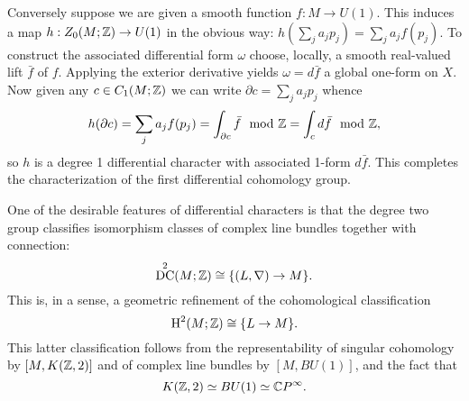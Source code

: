 \documentclass{amsart}
\DeclareMathOperator{\DC}{DC} %
\begin{document}
Conversely suppose we are given a smooth function
$f:M\to U(1)$. This induces a map $h:Z_0(M;\mathbb{Z})\to U(1)$ in the obvious way:
$h(\sum_ja_jp_j) = \sum_j a_j f(p_j)$. To construct the associated differential form $\omega$
choose, locally, a smooth real-valued lift $\bar f$ of $f$. Applying the exterior derivative
yields $\omega=d\bar f$ a global one-form on $X$.
Now given any $c\in C_1(M;\mathbb{Z})$ we can write
$\partial c = \sum_ja_jp_j$ whence
\begin{equation*}
    h(\partial c) = \sum_j a_j f(p_j) = \int_{\partial c} \bar f \mod{\mathbb{Z}}= \int_c d\bar f\mod {\mathbb{Z}},
\end{equation*}
so $h$ is a degree 1 differential character with associated 1-form $d\bar f$.
This completes the characterization of the first differential cohomology group.

One of the desirable features of differential characters is that the degree two group
classifies isomorphism classes of complex line bundles together with connection:
\begin{equation}
    \DC^2(M;\Z) \cong \{(L,\nabla)\to M\}.
    \label{classification}
\end{equation}
This is, in a sense, a geometric refinement of the cohomological classification
\begin{equation*}
    \operatorname{H}^2(M;\mathbb{Z}) \cong \{L\to M\}.
\end{equation*}
This latter classification follows from the representability of singular cohomology
by $[M, K(\mathbb{Z}, 2)]$ and of complex line bundles by $[M, BU(1)]$, and the fact that
\begin{equation*}
    K(\mathbb{Z},2) \simeq BU(1) \simeq \mathbb{C} P^\infty.
\end{equation*}
\end{document}
